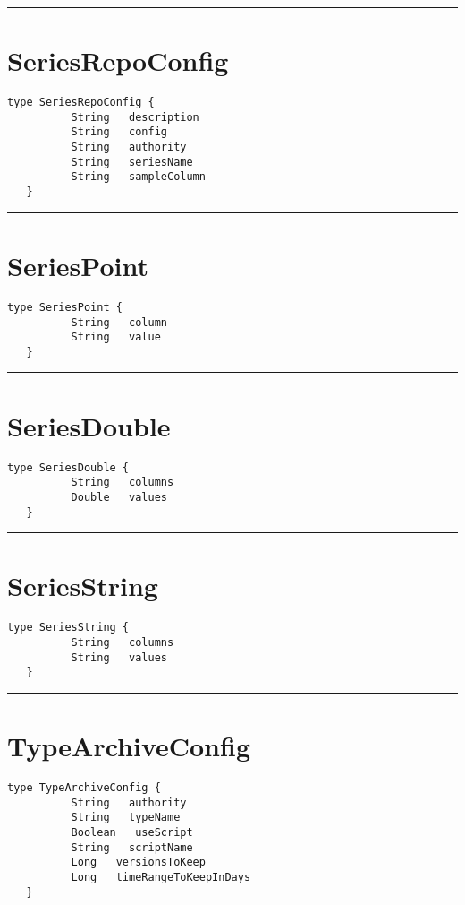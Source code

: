 \rule{12cm}{2pt}
\section{SeriesRepoConfig}
\label{type:SeriesRepoConfig}

\begin{lstlisting}[style=nonumbers]
   type SeriesRepoConfig {
          String   description
          String   config
          String   authority
          String   seriesName
          String   sampleColumn
   }
\end{lstlisting}

\rule{12cm}{2pt}
\section{SeriesPoint}
\label{type:SeriesPoint}

\begin{lstlisting}[style=nonumbers]
   type SeriesPoint {
          String   column
          String   value
   }
\end{lstlisting}

\rule{12cm}{2pt}
\section{SeriesDouble}
\label{type:SeriesDouble}

\begin{lstlisting}[style=nonumbers]
   type SeriesDouble {
          String   columns
          Double   values
   }
\end{lstlisting}

\rule{12cm}{2pt}
\section{SeriesString}
\label{type:SeriesString}

\begin{lstlisting}[style=nonumbers]
   type SeriesString {
          String   columns
          String   values
   }
\end{lstlisting}

\rule{12cm}{2pt}
\section{TypeArchiveConfig}
\label{type:TypeArchiveConfig}

\begin{lstlisting}[style=nonumbers]
   type TypeArchiveConfig {
          String   authority
          String   typeName
          Boolean   useScript
          String   scriptName
          Long   versionsToKeep
          Long   timeRangeToKeepInDays
   }
\end{lstlisting}

